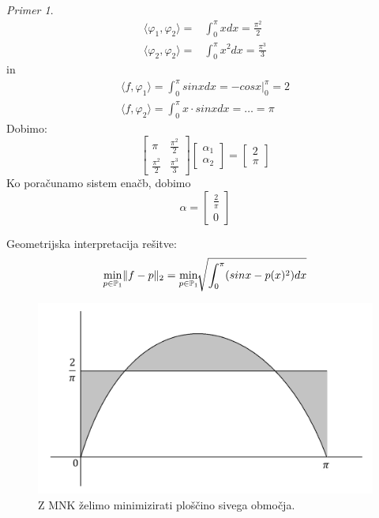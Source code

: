 \documentclass[a4paper,12pt]{article}
\DeclarePairedDelimiter\norm{\lVert}{\rVert}
\newcommand{\innerproduct}[2]{\langle #1, #2 \rangle}
\theoremstyle{definition}
\theoremstyle{remark}
\newtheorem*{ex}{Primer}
\newcommand{\Pp}{\mathbb{P}}
\begin{document}
\begin{ex}
\begin{align*}
        \innerproduct{\varphi_1}{\varphi_2} =& \int_{0}^{\pi} x dx = \frac{\pi^2}{2} \\
        \innerproduct{\varphi_2}{\varphi_2} =& \int_{0}^{\pi} x^2 dx = \frac{\pi^3}{3}
    \end{align*}
    in
    \begin{align*}
        \innerproduct{f}{\varphi_1} = \int_{0}^{\pi} sin x dx = - cos x \Biggr|_{0}^{\pi} = 2 \\
        \innerproduct{f}{\varphi_2} = \int_{0}^{\pi} x \cdot sin x dx = \dots = \pi
    \end{align*}
    Dobimo:
    \begin{equation*}
        \begin{bmatrix}
            \pi & \frac{\pi^2}{2} \\
            \frac{\pi^2}{2} & \frac{\pi^3}{3}
        \end{bmatrix}
        \begin{bmatrix}
            \alpha_1 \\
            \alpha_2
        \end{bmatrix}
        =
        \begin{bmatrix}
            2 \\
            \pi
        \end{bmatrix}
    \end{equation*}
    Ko poračunamo sistem enačb, dobimo
    \begin{equation*}
        \alpha =
        \begin{bmatrix}
            \frac{2}{\pi} \\
            0
        \end{bmatrix}
    \end{equation*}

    Geometrijska interpretacija rešitve:
    \begin{equation*}
        \min_{p \in \Pp_1} \norm{f - p}_2 = \min_{p \in \Pp_1} \sqrt[]{\int_{0}^{\pi} (sinx - p(x)^2) dx}
    \end{equation*}

    \begin{figure}[h]
        \center
        \includegraphics[scale=0.15]{mnk_geo_final.jpg}
        \caption{Z MNK želimo minimizirati ploščino sivega območja.}
    \end{figure}
\end{ex}
\end{document}
